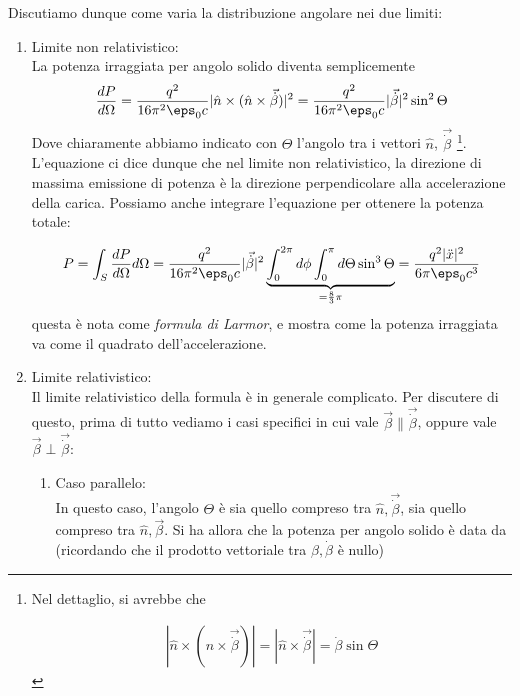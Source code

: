 \documentclass{report}
\begin{document}
Discutiamo dunque come varia la distribuzione angolare nei due limiti: 

\begin{enumerate}
    \item Limite non relativistico: \\
    La potenza irraggiata per angolo solido diventa semplicemente 
    \begin{align}
        \frac{dP}{d\Omega} = \frac{q^2}{16\pi^2\eps_0 c}|\hat{n}\times(\hat{n}\times\vec{\dot{\beta}})|^2 =  \frac{q^2}{16\pi^2\eps_0 c} |\vec{\dot{\beta}}|^2\sin^2\Theta 
    \end{align}
    Dove chiaramente abbiamo indicato con \(\Theta\) l'angolo tra i vettori \(\hat{n}\), \(\vec{\dot{\beta}}\) \footnote{Nel dettaglio, si avrebbe che 
    
    \begin{align}
        |\hat{n} \times (\hat{n} \times \vec{\dot{\beta}})| = |\hat{n} \times \vec{\dot{\beta}}| = \dot{\beta}\sin\Theta
    \end{align}
    
    
    }. L'equazione ci dice dunque che nel limite non relativistico, la direzione di massima emissione di potenza è la direzione perpendicolare alla accelerazione della carica. 
    Possiamo anche integrare l'equazione per ottenere la potenza totale: 

    \begin{align}
        P = \int_S \frac{dP}{d\Omega}d\Omega = \frac{q^2}{16\pi^2\eps_0 c} |\vec{\dot{\beta}}|^2\underbrace{\int_0^{2\pi}d\phi \int_0^{\pi}d\Theta \sin^3\Theta}_{= \frac{8}{3}\pi} = \frac{q^2 |\ddot{x}|^2}{6\pi \eps_0 c^3}
    \end{align}
    questa è nota come \emph{formula di Larmor}, e mostra come la potenza irraggiata va come il quadrato dell'accelerazione. 
    \item Limite relativistico: \\
    Il limite relativistico della formula è in generale complicato. Per discutere di questo, prima di tutto vediamo i casi specifici in cui vale \(\vec{\beta}\parallel \vec{\dot{\beta}}\), oppure vale \(\vec{\beta} \perp \vec{\dot{\beta}}\): 
    \begin{enumerate}
        \item Caso parallelo: \\
        In questo caso, l'angolo \(\Theta\) è sia quello compreso tra \(\hat{n}, \vec{\dot{\beta}}\), sia quello compreso tra \(\hat{n}, \vec{\beta}\). Si ha allora che la potenza per angolo solido è data da (ricordando che il prodotto vettoriale tra \(\beta, \dot{\beta}\) è nullo) 


\end{enumerate}
\end{enumerate}
\end{document}
